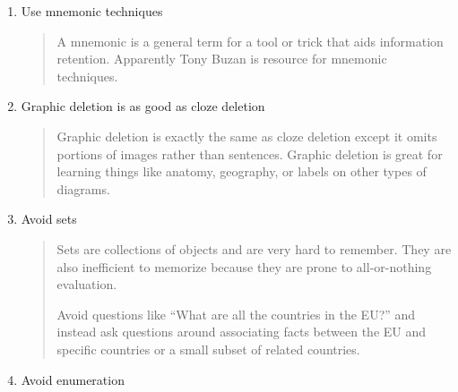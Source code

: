 \documentclass[]{tufte-handout}
\begin{document}
\begin{enumerate}
\item{Use mnemonic techniques}

\begin{quote}
A mnemonic is a general term for a tool or trick that aids information retention. Apparently Tony Buzan is resource for mnemonic techniques.
\end{quote}

\item{Graphic deletion is as good as cloze deletion}

\begin{quote}
Graphic deletion is exactly the same as cloze deletion except it omits portions of images rather than sentences. Graphic deletion is great for learning things like anatomy, geography, or labels on other types of diagrams.

\begin{marginfigure}%
\end{marginfigure}

\end{quote}

\item{Avoid sets}

\begin{quote}
Sets are collections of objects and are very hard to remember. They are also inefficient to memorize because they are prone to all-or-nothing evaluation.

Avoid questions like ``What are all the countries in the EU?'' and instead ask questions around associating facts between the EU and specific countries or a small subset of related countries.
\end{quote}

\item{Avoid enumeration}


\end{enumerate}
\end{document}
